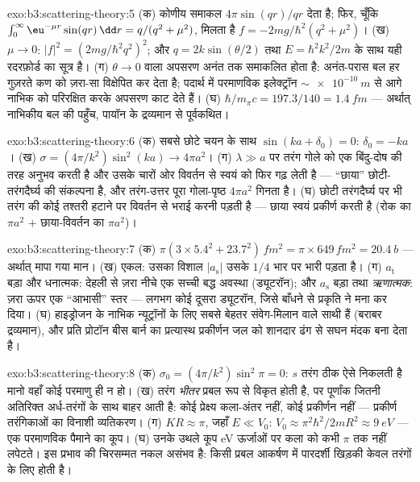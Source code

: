 \begin{solution}{exo:b3:scattering-theory:5}
(क) कोणीय समाकल $4\pi\sin(qr)/qr$ देता है; फिर, चूँकि
$\int_0^\infty\eu^{-\mu r}\sin(qr)\,\dd r = q/(q^2 + \mu^2)$,
मिलता है $f = -2mg/\hbar^2(q^2 + \mu^2)$। (ख) $\mu \to 0$: $|f|^2 =
(2mg/\hbar^2q^2)^2$; और $q = 2k\sin(\theta/2)$ तथा $E =
\hbar^2k^2/2m$ के साथ यही रदरफ़ोर्ड का सूत्र है। (ग) $\theta \to
0$ वाला अपसरण अनंत तक समाकलित होता है: अनंत-परास बल हर गुज़रते कण
को ज़रा-सा विक्षेपित कर देता है; पदार्थ में परमाणविक
इलेक्ट्रॉन $\sim\qty{e-10}{m}$ से आगे नाभिक को परिरक्षित करके
अपसरण काट देते हैं। (घ) $\hbar/m_\pi c = 197.3/140 = \qty{1.4}{fm}$
--- अर्थात् नाभिकीय बल की पहुँच, पायॉन के द्रव्यमान से पूर्वकथित।
\end{solution}

\begin{solution}{exo:b3:scattering-theory:6}
(क) सबसे छोटे चयन के साथ $\sin(ka + \delta_0) = 0$: $\delta_0
= -ka$। (ख) $\sigma = (4\pi/k^2)\sin^2(ka) \to 4\pi a^2$। (ग)
$\lambda \gg a$ पर तरंग गोले को एक बिंदु-दोष की तरह अनुभव करती है
और उसके चारों ओर विवर्तन से स्वयं को फिर गढ़ लेती है --- ``छाया''
छोटी-तरंगदैर्घ्य की संकल्पना है, और तरंग-उत्तर पूरा गोला-पृष्ठ
$4\pi a^2$ गिनता है। (घ) छोटी तरंगदैर्घ्य पर भी
तरंग की कोई तश्तरी हटाने पर विवर्तन से भराई करनी पड़ती है --- छाया
स्वयं प्रकीर्ण करती है (रोक का $\pi a^2$ $+$ छाया-विवर्तन का
$\pi a^2$)।
\end{solution}

\begin{solution}{exo:b3:scattering-theory:7}
(क) $\pi(3 \times 5.4^2 + 23.7^2)\,\unit{fm^2} = \pi \times 649
\,\unit{fm^2} = \qty{20.4}{b}$ --- अर्थात् मापा गया मान। (ख)
एकल: उसका विशाल $|a_{\text{s}}|$ उसके $1/4$ भार पर भारी पड़ता है। (ग)
$a_{\text{t}}$ बड़ा और धनात्मक: देहली से ज़रा नीचे एक सच्ची बद्ध
अवस्था (ड्यूटरॉन); और $a_{\text{s}}$ बड़ा तथा
\emph{ऋणात्मक}: ज़रा ऊपर एक ``आभासी'' स्तर --- लगभग कोई
दूसरा ड्यूटरॉन, जिसे बाँधने से प्रकृति ने मना कर दिया। (घ) हाइड्रोजन
के नाभिक न्यूट्रॉनों के लिए सबसे बेहतर संवेग-मिलान वाले साथी हैं
(बराबर द्रव्यमान), और प्रति प्रोटॉन बीस बार्न का प्रत्यास्थ प्रकीर्णन
जल को शानदार ढंग से सघन मंदक बना देता है।
\end{solution}

\begin{solution}{exo:b3:scattering-theory:8}
(क) $\sigma_0 = (4\pi/k^2)\sin^2\pi = 0$: $s$ तरंग ठीक ऐसे निकलती
है मानो वहाँ कोई परमाणु ही न हो। (ख) तरंग \emph{भीतर} प्रबल रूप से
विकृत होती है, पर पूर्णांक जितनी अतिरिक्त अर्ध-तरंगों के साथ बाहर
आती है: कोई प्रेक्ष्य कला-अंतर नहीं, कोई प्रकीर्णन नहीं ---
प्रकीर्ण तरंगिकाओं का विनाशी व्यतिकरण। (ग) $KR
\approx \pi$, जहाँ $E \ll V_0$: $V_0 \approx \pi^2\hbar^2/2mR^2
\approx \qty{9}{eV}$ --- एक परमाणविक पैमाने का कूप। (घ) उनके
उथले कूप eV ऊर्जाओं पर कला को कभी $\pi$ तक नहीं लपेटते।
इस प्रभाव की चिरसम्मत नकल असंभव है: किसी प्रबल आकर्षण में पारदर्शी
खिड़की केवल तरंगों के लिए होती है।
\end{solution}

